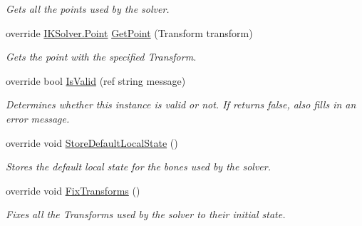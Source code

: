 \begin{DoxyCompactItemize}
\begin{DoxyCompactList}\small\item\em Gets all the points used by the solver. \end{DoxyCompactList}\item 
override \mbox{\hyperlink{class_root_motion_1_1_final_i_k_1_1_i_k_solver_1_1_point}{I\+K\+Solver.\+Point}} \mbox{\hyperlink{class_root_motion_1_1_final_i_k_1_1_i_k_solver_full_body_a7d50e5600dfb189d37780f8e74b9b5f9}{Get\+Point}} (Transform transform)
\begin{DoxyCompactList}\small\item\em Gets the point with the specified Transform. \end{DoxyCompactList}\item 
override bool \mbox{\hyperlink{class_root_motion_1_1_final_i_k_1_1_i_k_solver_full_body_a52e5312dcea8441bec26f0a9c2bf54f2}{Is\+Valid}} (ref string message)
\begin{DoxyCompactList}\small\item\em Determines whether this instance is valid or not. If returns false, also fills in an error message. \end{DoxyCompactList}\item 
override void \mbox{\hyperlink{class_root_motion_1_1_final_i_k_1_1_i_k_solver_full_body_a6218fb49ef96ab8f19a6016c91cb26ad}{Store\+Default\+Local\+State}} ()
\begin{DoxyCompactList}\small\item\em Stores the default local state for the bones used by the solver. \end{DoxyCompactList}\item 
override void \mbox{\hyperlink{class_root_motion_1_1_final_i_k_1_1_i_k_solver_full_body_ad2db122b4977cefd66fad54e26d38671}{Fix\+Transforms}} ()
\begin{DoxyCompactList}\small\item\em Fixes all the Transforms used by the solver to their initial state. \end{DoxyCompactList}\end{DoxyCompactItemize}
